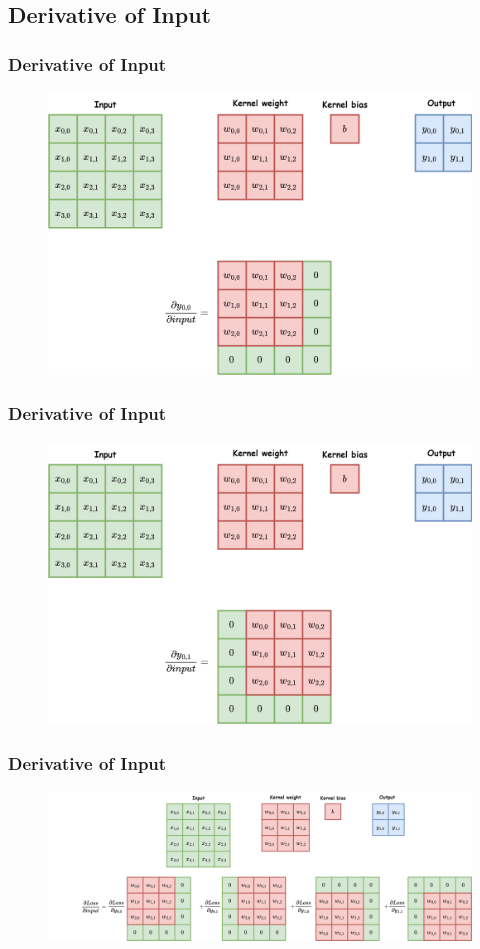 \documentclass{beamer}
\begin{document}
    \subsection{Derivative of Input}
    
    \begin{frame}
    	\frametitle{Derivative of Input}
		\begin{figure}
			\includegraphics[width=0.7\linewidth]{src/input_grad.drawio}
		\end{figure}
    \end{frame}
    
    \begin{frame}
    	\frametitle{Derivative of Input}
		\begin{figure}
			\includegraphics[width=0.7\linewidth]{"src/input_grad.drawio (1)"}
		\end{figure}
    \end{frame}
    
    \begin{frame}
    	\frametitle{Derivative of Input}
		\begin{figure}
			\includegraphics[width=1.\linewidth]{"src/input_grad.drawio (2)"}
		\end{figure}
    \end{frame}
    
\end{document}
